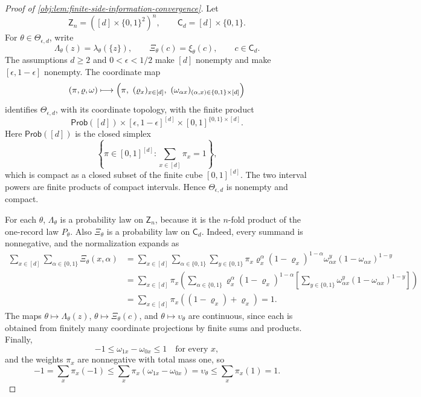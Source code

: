 \documentclass[11pt]{article}
\begin{document}
\begin{proof}[Proof of \cref{obj:lem:finite-side-information-convergence}]
Let
\[
\mathsf Z_n=([d]\times\{0,1\}^2)^n,
\qquad
\mathsf C_d=[d]\times\{0,1\}.
\]
For \(\theta\in\Theta_{\epsilon,d}\), write
\[
\Lambda_\theta(z)=\lambda_\theta(\{z\}),\qquad
\Xi_\theta(c)=\xi_\theta(c),\qquad c\in\mathsf C_d .
\]
The assumptions \(d\ge2\) and \(0<\epsilon<1/2\) make \([d]\) nonempty and make
\([\epsilon,1-\epsilon]\) nonempty. The coordinate map
\[
(\pi,\varrho,\omega)
\longmapsto
\Bigl(\pi,\ (\varrho_x)_{x\in[d]},\ (\omega_{\alpha x})_{(\alpha,x)\in\{0,1\}\times[d]}\Bigr)
\]
identifies \(\Theta_{\epsilon,d}\), with its coordinate topology, with the finite product
\[
\mathsf{Prob}([d])
\times
[\epsilon,1-\epsilon]^{[d]}
\times
[0,1]^{\{0,1\}\times[d]} .
\]
Here \(\mathsf{Prob}([d])\) is the closed simplex
\[
\left\{\pi\in[0,1]^{[d]}:\sum_{x\in[d]}\pi_x=1\right\},
\]
which is compact as a closed subset of the finite cube \([0,1]^{[d]}\). The two interval powers are finite products of compact intervals. Hence \(\Theta_{\epsilon,d}\) is nonempty and compact.

For each \(\theta\), \(\Lambda_\theta\) is a probability law on \(\mathsf Z_n\), because it is the
\(n\)-fold product of the one-record law \(P_\theta\). Also \(\Xi_\theta\) is a probability law on
\(\mathsf C_d\). Indeed, every summand is nonnegative, and the normalization expands as
\[
\begin{aligned}
\sum_{x\in[d]}\sum_{\alpha\in\{0,1\}}\Xi_\theta(x,\alpha)
&=
\sum_{x\in[d]}\sum_{\alpha\in\{0,1\}}\sum_{y\in\{0,1\}}
\pi_x\varrho_x^\alpha(1-\varrho_x)^{1-\alpha}
\omega_{\alpha x}^y(1-\omega_{\alpha x})^{1-y}\\
&=
\sum_{x\in[d]}\pi_x
\left(\sum_{\alpha\in\{0,1\}}\varrho_x^\alpha(1-\varrho_x)^{1-\alpha}
\left[\sum_{y\in\{0,1\}}\omega_{\alpha x}^y(1-\omega_{\alpha x})^{1-y}\right]\right)\\
&=
\sum_{x\in[d]}\pi_x
\left((1-\varrho_x)+\varrho_x\right)
=1 .
\end{aligned}
\]
The maps \(\theta\mapsto\Lambda_\theta(z)\), \(\theta\mapsto\Xi_\theta(c)\), and
\(\theta\mapsto\upsilon_\theta\) are continuous, since each is obtained from finitely many coordinate
projections by finite sums and products. Finally,
\[
-1\le \omega_{1x}-\omega_{0x}\le1
\quad\text{for every }x,
\]
and the weights \(\pi_x\) are nonnegative with total mass one, so
\[
-1
=
\sum_x\pi_x(-1)
\le
\sum_x\pi_x(\omega_{1x}-\omega_{0x})
=
\upsilon_\theta
\le
\sum_x\pi_x(1)
=
1 .
\]


\end{proof}
\end{document}

